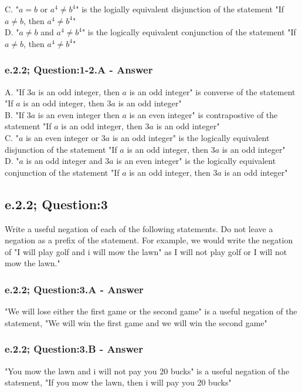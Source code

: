 C. "$a = b$ or $a^4 \neq b^4$" is the logially equivalent disjunction of the statement "If $a \neq b$, then $a^4 \neq b^4$" \\

D. "$a \neq b$ and $a^4 \neq b^4$" is the logically equivalent conjunction of the statement "If $a \neq b$, then $a^4 \neq b^4$" \\

\subsubsection*{e.2.2; Question:1-2.A - Answer}
A. "If $3a$ is an odd integer, then $a$ is an odd integer" is converse of the statement "If $a$ is an odd integer, then $3a$ is an odd integer" \\

B. "If $3a$ is an even integer then $a$ is an even integer" is contrapostive of the statement "If $a$ is an odd integer, then $3a$ is an odd integer" \\

C. "$a$ is an even integer or $3a$ is an odd integer" is the logically equivalent disjunction of the statement "If $a$ is an odd integer, then $3a$ is an odd integer" \\

D. "$a$ is an odd integer and $3a$ is an even integer" is the logically equivalent conjunction of the statement "If $a$ is an odd integer, then $3a$ is an odd integer" \\

\subsection{e.2.2; Question:3}
Write a useful negation of each of the following statements. Do not leave a negation as a prefix of the statement. For example, we would write the negation of "I will play golf and i will mow the lawn" as I will not play golf or I will not mow the lawn." \\

\subsubsection*{e.2.2; Question:3.A - Answer}
"We will lose either the first game or the second game" is a useful negation of the statement, "We will win the first game and we will win the second game"

\subsubsection*{e.2.2; Question:3.B - Answer}
"You mow the lawn and i will not pay you 20 bucks" is a useful negation of the statement, "If you mow the lawn, then i will pay you 20 bucks"

